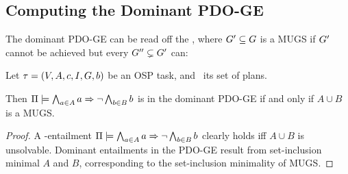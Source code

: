 \subsection{Computing the Dominant PDO-GE}
\label{goaldep:computing}

The dominant PDO-GE can be read off the , where $G' \subseteq G$ is a MUGS if
$G'$ cannot be achieved but every $G'' \subsetneq G'$ can:

\begin{proposition}
Let $\tau =
(V,\allowbreak A,\allowbreak{\ensuremath{c}},\allowbreak I,\allowbreak G,\allowbreak{\ensuremath{b}})$
be an OSP task, and \plans\ its set of plans.  

Then $\Pi \models \bigwedge_{a \in A} a \Rightarrow \neg \bigwedge_{b \in B}
  b$ is in the dominant PDO-GE if and only if $A \cup B$ is a MUGS.
\end{proposition}

\begin{proof}
A \plans-entailment $\Pi \models \bigwedge_{a \in A} a \Rightarrow \neg
  \bigwedge_{b \in B} b$ clearly holds iff $A \cup B$ is
unsolvable. Dominant entailments in the PDO-GE result from
set-inclusion minimal $A$ and $B$, corresponding to the set-inclusion
minimality of MUGS.
\end{proof}



%
%
%
%
%

